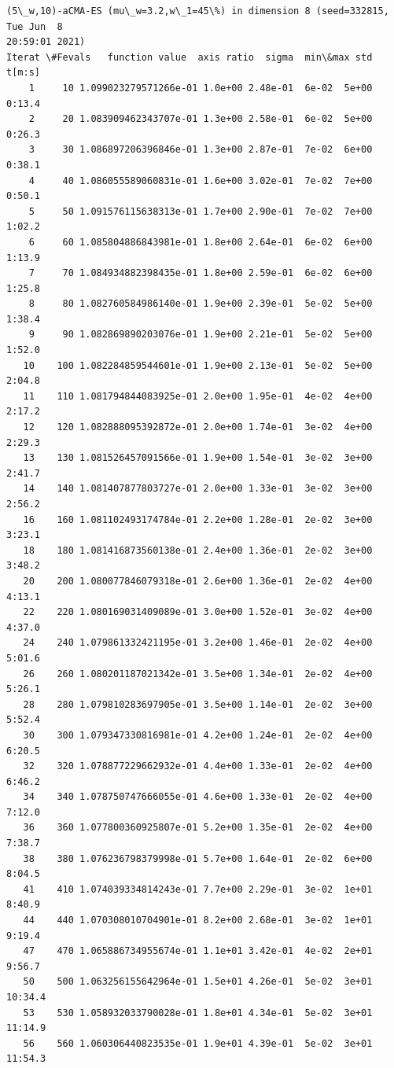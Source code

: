 \documentclass[11pt]{article}
\begin{document}
    \begin{Verbatim}[commandchars=\\\{\}]
(5\_w,10)-aCMA-ES (mu\_w=3.2,w\_1=45\%) in dimension 8 (seed=332815, Tue Jun  8
20:59:01 2021)
Iterat \#Fevals   function value  axis ratio  sigma  min\&max std  t[m:s]
    1     10 1.099023279571266e-01 1.0e+00 2.48e-01  6e-02  5e+00 0:13.4
    2     20 1.083909462343707e-01 1.3e+00 2.58e-01  6e-02  5e+00 0:26.3
    3     30 1.086897206396846e-01 1.3e+00 2.87e-01  7e-02  6e+00 0:38.1
    4     40 1.086055589060831e-01 1.6e+00 3.02e-01  7e-02  7e+00 0:50.1
    5     50 1.091576115638313e-01 1.7e+00 2.90e-01  7e-02  7e+00 1:02.2
    6     60 1.085804886843981e-01 1.8e+00 2.64e-01  6e-02  6e+00 1:13.9
    7     70 1.084934882398435e-01 1.8e+00 2.59e-01  6e-02  6e+00 1:25.8
    8     80 1.082760584986140e-01 1.9e+00 2.39e-01  5e-02  5e+00 1:38.4
    9     90 1.082869890203076e-01 1.9e+00 2.21e-01  5e-02  5e+00 1:52.0
   10    100 1.082284859544601e-01 1.9e+00 2.13e-01  5e-02  5e+00 2:04.8
   11    110 1.081794844083925e-01 2.0e+00 1.95e-01  4e-02  4e+00 2:17.2
   12    120 1.082888095392872e-01 2.0e+00 1.74e-01  3e-02  4e+00 2:29.3
   13    130 1.081526457091566e-01 1.9e+00 1.54e-01  3e-02  3e+00 2:41.7
   14    140 1.081407877803727e-01 2.0e+00 1.33e-01  3e-02  3e+00 2:56.2
   16    160 1.081102493174784e-01 2.2e+00 1.28e-01  2e-02  3e+00 3:23.1
   18    180 1.081416873560138e-01 2.4e+00 1.36e-01  2e-02  3e+00 3:48.2
   20    200 1.080077846079318e-01 2.6e+00 1.36e-01  2e-02  4e+00 4:13.1
   22    220 1.080169031409089e-01 3.0e+00 1.52e-01  3e-02  4e+00 4:37.0
   24    240 1.079861332421195e-01 3.2e+00 1.46e-01  2e-02  4e+00 5:01.6
   26    260 1.080201187021342e-01 3.5e+00 1.34e-01  2e-02  4e+00 5:26.1
   28    280 1.079810283697905e-01 3.5e+00 1.14e-01  2e-02  3e+00 5:52.4
   30    300 1.079347330816981e-01 4.2e+00 1.24e-01  2e-02  4e+00 6:20.5
   32    320 1.078877229662932e-01 4.4e+00 1.33e-01  2e-02  4e+00 6:46.2
   34    340 1.078750747666055e-01 4.6e+00 1.33e-01  2e-02  4e+00 7:12.0
   36    360 1.077800360925807e-01 5.2e+00 1.35e-01  2e-02  4e+00 7:38.7
   38    380 1.076236798379998e-01 5.7e+00 1.64e-01  2e-02  6e+00 8:04.5
   41    410 1.074039334814243e-01 7.7e+00 2.29e-01  3e-02  1e+01 8:40.9
   44    440 1.070308010704901e-01 8.2e+00 2.68e-01  3e-02  1e+01 9:19.4
   47    470 1.065886734955674e-01 1.1e+01 3.42e-01  4e-02  2e+01 9:56.7
   50    500 1.063256155642964e-01 1.5e+01 4.26e-01  5e-02  3e+01 10:34.4
   53    530 1.058932033790028e-01 1.8e+01 4.34e-01  5e-02  3e+01 11:14.9
   56    560 1.060306440823535e-01 1.9e+01 4.39e-01  5e-02  3e+01 11:54.3

\end{Verbatim}
\end{document}
